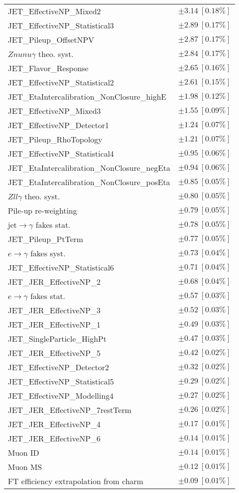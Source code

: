 \begin{tabular}{lr}
JET\_EffectiveNP\_Mixed2 & $\pm 3.14\ [0.18\%]$ \\
JET\_EffectiveNP\_Statistical3 & $\pm 2.89\ [0.17\%]$ \\
JET\_Pileup\_OffsetNPV & $\pm 2.87\ [0.17\%]$ \\
$Znunu\gamma$ theo. syst. & $\pm 2.84\ [0.17\%]$ \\
JET\_Flavor\_Response & $\pm 2.65\ [0.16\%]$ \\
JET\_EffectiveNP\_Statistical2 & $\pm 2.61\ [0.15\%]$ \\
JET\_EtaIntercalibration\_NonClosure\_highE & $\pm 1.98\ [0.12\%]$ \\
JET\_EffectiveNP\_Mixed3 & $\pm 1.55\ [0.09\%]$ \\
JET\_EffectiveNP\_Detector1 & $\pm 1.24\ [0.07\%]$ \\
JET\_Pileup\_RhoTopology & $\pm 1.21\ [0.07\%]$ \\
JET\_EffectiveNP\_Statistical4 & $\pm 0.95\ [0.06\%]$ \\
JET\_EtaIntercalibration\_NonClosure\_negEta & $\pm 0.94\ [0.06\%]$ \\
JET\_EtaIntercalibration\_NonClosure\_posEta & $\pm 0.85\ [0.05\%]$ \\
$Zll\gamma$ theo. syst. & $\pm 0.80\ [0.05\%]$ \\
Pile-up re-weighting & $\pm 0.79\ [0.05\%]$ \\
jet$\to\gamma$ fakes stat. & $\pm 0.78\ [0.05\%]$ \\
JET\_Pileup\_PtTerm & $\pm 0.77\ [0.05\%]$ \\
$e\to\gamma$ fakes syst. & $\pm 0.73\ [0.04\%]$ \\
JET\_EffectiveNP\_Statistical6 & $\pm 0.71\ [0.04\%]$ \\
JET\_JER\_EffectiveNP\_2 & $\pm 0.68\ [0.04\%]$ \\
$e\to\gamma$ fakes stat. & $\pm 0.57\ [0.03\%]$ \\
JET\_JER\_EffectiveNP\_3 & $\pm 0.52\ [0.03\%]$ \\
JET\_JER\_EffectiveNP\_1 & $\pm 0.49\ [0.03\%]$ \\
JET\_SingleParticle\_HighPt & $\pm 0.47\ [0.03\%]$ \\
JET\_JER\_EffectiveNP\_5 & $\pm 0.42\ [0.02\%]$ \\
JET\_EffectiveNP\_Detector2 & $\pm 0.32\ [0.02\%]$ \\
JET\_EffectiveNP\_Statistical5 & $\pm 0.29\ [0.02\%]$ \\
JET\_EffectiveNP\_Modelling4 & $\pm 0.27\ [0.02\%]$ \\
JET\_JER\_EffectiveNP\_7restTerm & $\pm 0.26\ [0.02\%]$ \\
JET\_JER\_EffectiveNP\_4 & $\pm 0.17\ [0.01\%]$ \\
JET\_JER\_EffectiveNP\_6 & $\pm 0.14\ [0.01\%]$ \\
Muon ID & $\pm 0.14\ [0.01\%]$ \\
Muon MS & $\pm 0.12\ [0.01\%]$ \\
FT efficiency extrapolation from charm & $\pm 0.09\ [0.01\%]$ \\
\hline
\end{tabular}
